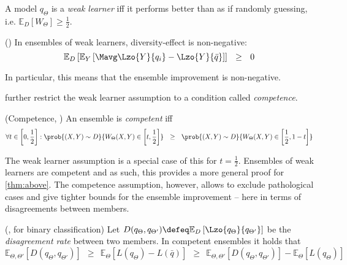 \documentclass[../main.tex]{subfiles}
\begin{document}
\begin{definition} 
   \label{def:weak-learner} 
    A model $q_\Theta$ is a \textit{weak learner} iff it performs better than as if randomly guessing, i.e. $\mathbb{E}_{D}\left[ W_{\Theta} \right] \geq \frac{1}{2}$.
\end{definition}

\begin{theorem} (\cite{wood23}) In ensembles of weak learners, diversity-effect is non-negative:
$$
\mathbb{E}_{D}\left[ 
\mathbb{E}_{Y}\left[ 
\Mavg \Lzo{Y}{q_{i}} - \Lzo{Y}{\bar{q}}
\right] 
\right] 
~ ~ \geq ~ ~ 0
$$
\end{theorem}

In particular, this means that the ensemble improvement is non-negative. 

\cite{theisen} further restrict the weak learner assumption to a condition called \textit{competence}.
\begin{definition} (Competence, \cite{theisen})
An ensemble is \textit{competent} iff
$$
\forall t  \in \left[ 0, \frac{1}{2} \right] : \prob{(X,Y) \sim D}{ W_{\Theta}(X,Y) \in \left[ t, \frac{1}{2} \right]} 
~ ~ \geq ~ ~
\prob{(X,Y)\sim D}{W_{\Theta}(X,Y) \in \left[ \frac{1}{2}, 1-t \right]}
$$
\end{definition}
The weak learner assumption is a special case of this for $t = \frac{1}{2}$. Ensembles of weak learners are competent and as such, this provides a more general proof for \ref{thm:above}. The competence assumption, however, allows to exclude pathological cases and give tighter bounds for the ensemble improvement -- here in terms of disagreements between members.
\begin{theorem} (\cite{theisen}, for binary classification) Let $D(q_{\Theta}, q_{\Theta'}) \defeq \mathbb{E}_{D}\left[ \Lzo{q_{\Theta}}{q_{\Theta'}} \right]$ be the \textit{disagreement rate} between two members. In competent ensembles it holds that
$$
\mathbb{E}_{\Theta, \Theta'}\left[ D(q_{\Theta}, q_{\Theta'}) \right] 
~ ~  \geq ~ ~ 
\mathbb{E}_{\Theta}\left[ L(q_{\Theta}) - L(\bar{q}) \right] 
~ ~  \geq ~ ~ 
\mathbb{E}_{\Theta, \Theta'}\left[ D(q_{\Theta}, q_{\Theta'}) \right] - \mathbb{E}_{\Theta}\left[ L(q_{\Theta}) \right]  
$$
\end{theorem}
\end{document}
